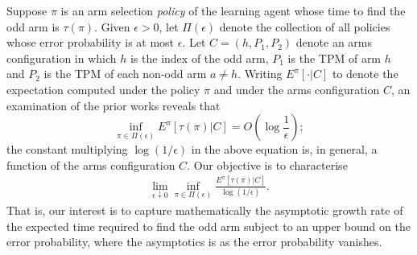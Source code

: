 Suppose $\pi$ is an arm selection {\em policy} of the learning agent whose time to find the odd arm is $\tau(\pi)$. Given $\epsilon>0$, let $\Pi(\epsilon)$ denote the collection of all policies whose error probability is at most $\epsilon$. Let $C=(h, P_{1}, P_{2})$ denote an arms configuration in which $h$ is the index of the odd arm, $P_{1}$ is the TPM of arm $h$ and $P_{2}$ is the TPM of each non-odd arm $a\neq h$. Writing $E^{\pi}[\cdot|C]$ to denote the expectation computed under the policy $\pi$ and under the arms configuration $C$, an examination of the prior works reveals that $$ \inf\limits_{\pi\in \Pi(\epsilon)} E^{\pi}[\tau(\pi)|C] = O\left(\log \frac{1}{\epsilon}\right); $$ the constant multiplying $\log (1/\epsilon)$ in the above equation is, in general, a function of the arms configuration $C$. Our objective is to characterise
\begin{align}
\lim\limits_{\epsilon\downarrow 0}  \inf\limits_{\pi\in \Pi(\epsilon)} \frac{E^{\pi}[\tau(\pi)|C]}{\log (1/\epsilon)}.
\label{eq:intro_main_problem}
\end{align}
That is, our interest is to capture mathematically the asymptotic growth rate of the expected time required to find the odd arm subject to an upper bound on the error probability, where the asymptotics is as the error probability vanishes.

